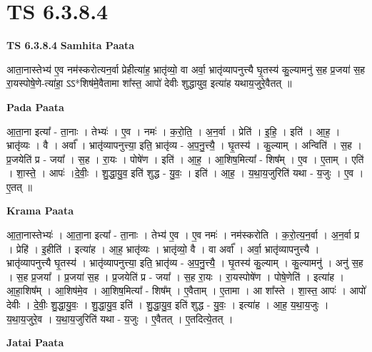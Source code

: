 \documentclass[17pt]{extarticle}
\begin{document}
\section{ TS 6.3.8.4 }

\textbf{TS 6.3.8.4 } \newline
\textbf{Samhita Paata} \newline

आता॒नास्तेभ्य॑ ए॒व नम॑स्करोत्यन॒र्वा प्रेहीत्या॑ह॒ भ्रातृ॑व्यो॒ वा अर्वा॒ भ्रातृ॑व्यापनुत्त्यै घृ॒तस्य॑ कु॒ल्यामनु॑ स॒ह प्र॒जया॑ स॒ह रा॒यस्पोषे॒णे-त्या॑हा॒ ऽऽ*शिष॑मे॒वैतामा शा᳚स्त॒ आपो॑ देवीः शुद्धायुव॒ इत्या॑ह यथाय॒जुरे॒वैतत् ॥ \newline

\textbf{Pada Paata} \newline

आ॒ता॒ना इत्या᳚ - ता॒नाः । तेभ्यः॑ । ए॒व । नमः॑ । क॒रो॒ति॒ । अ॒न॒र्वा । प्रेति॑ । इ॒हि॒ । इति॑ । आ॒ह॒ । भ्रातृ॑व्यः । वै । अर्वा᳚ । भ्रातृ॑व्यापनुत्त्या॒ इति॒ भ्रातृ॑व्य - अ॒प॒नु॒त्त्यै॒ । घृ॒तस्य॑ । कु॒ल्याम् । अन्विति॑ । स॒ह । प्र॒जयेति॑ प्र - जया᳚ । स॒ह । रा॒यः । पोषे॑ण । इति॑ । आ॒ह॒ । आ॒शिष॒मित्या᳚ - शिष᳚म् । ए॒व । ए॒ताम् । एति॑ । शा॒स्ते॒ । आपः॑ ।दे॒वीः॒ । शु॒द्धा॒यु॒व॒ इति॑ शुद्ध - यु॒वः॒ । इति॑ । आ॒ह॒ । य॒था॒य॒जुरिति॑ यथा - य॒जुः । ए॒व । ए॒तत् ॥  \newline


\textbf{Krama Paata} \newline

आ॒ता॒नास्तेभ्यः॑ । आ॒ता॒ना इत्या᳚ - ता॒नाः । तेभ्य॑ ए॒व । ए॒व नमः॑ । नम॑स्करोति । क॒रो॒त्य॒न॒र्वा । अ॒न॒र्वा प्र । प्रेहि॑ । इ॒हीति॑ । इत्या॑ह । आ॒ह॒ भ्रातृ॑व्यः । भ्रातृ॑व्यो॒ वै । वा अर्वा᳚ । अर्वा॒ भ्रातृ॑व्यापनुत्त्यै । भ्रातृ॑व्यापनुत्त्यै घृ॒तस्य॑ । भ्रातृ॑व्यापनुत्त्या॒ इति॒ भ्रातृ॑व्य - अ॒प॒नु॒त्त्यै॒ । घृ॒तस्य॑ कु॒ल्याम् । कु॒ल्यामनु॑ । अनु॑ स॒ह । स॒ह प्र॒जया᳚ । प्र॒जया॑ स॒ह । प्र॒जयेति॑ प्र - जया᳚ । स॒ह रा॒यः । रा॒यस्पोषे॑ण । पोषे॒णेति॑ । इत्या॑ह । आ॒हा॒शिष᳚म् । आ॒शिष॑मे॒व । आ॒शिष॒मित्या᳚ - शिष᳚म् । ए॒वैताम् । ए॒तामा । आ शा᳚स्ते । शा॒स्त॒ आपः॑ । आपो॑ देवीः । दे॒वीः॒ शु॒द्धा॒यु॒वः॒ । शु॒द्धा॒यु॒व॒ इति॑ । शु॒द्धा॒यु॒व॒ इति॑ शुद्ध - यु॒वः॒ । इत्या॑ह । आ॒ह॒ य॒था॒य॒जुः । य॒था॒य॒जुरे॒व । य॒था॒य॒जुरिति॑ यथा - य॒जुः । ए॒वैतत् । ए॒तदित्ये॒तत् । \newline

\textbf{Jatai Paata} \newline
\end{document}
